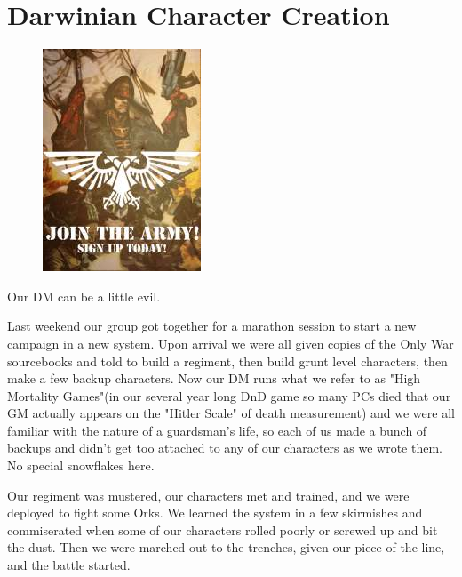 \chapter{Darwinian Character Creation}

\begin{figure}
	\begin{center}
		\includegraphics[width=\figwidth]{pics/1/1.jpg}
	\end{center}
\end{figure}

Our DM can be a little evil.

Last weekend our group got together for a marathon session to start a new campaign in a new system.
Upon arrival we were all given copies of the Only War sourcebooks and told to build a regiment, then build grunt level characters, then make a few backup characters.
Now our DM runs what we refer to as "High Mortality Games"(in our several year long DnD game so many PCs died that our GM actually appears on the "Hitler Scale" of death measurement) and we were all familiar with the nature of a guardsman's life, so each of us made a bunch of backups and didn't get too attached to any of our characters as we wrote them.
No special snowflakes here.

Our regiment was mustered, our characters met and trained, and we were deployed to fight some Orks. %
We learned the system in a few skirmishes and commiserated when some of our characters rolled poorly or screwed up and bit the dust.
Then we were marched out to the trenches, given our piece of the line, and the battle started.


